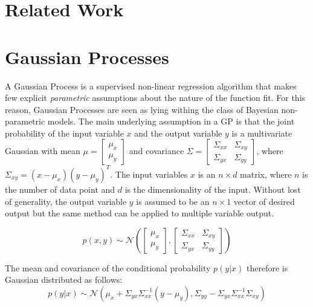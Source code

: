 \documentclass[a4paper,12pt]{article}
\begin{document}
\section{Related Work}
\label{sec-related-work}

\section{Gaussian Processes}
\label{sec-gaussian-process}

A Gaussian Process is a supervised non-linear regression algorithm that makes few explicit \emph{parametric} assumptions about the nature of the function fit. For this reason, Gaussian Processes are seen as lying withing the class of Bayesian non-parametric models. The main underlying assumption in a GP is that the joint probability of the input variable $x$ and the output variable $y$ is a multivariate Gaussian with mean $\mu=\begin{bmatrix} \mu_{x}\\ \mu_{y}\end{bmatrix}$ and covariance $\Sigma=\begin{bmatrix}\Sigma_{xx} & \Sigma_{xy}\\\Sigma_{yx} & \Sigma_{yy} \end{bmatrix}$, where $\Sigma_{xy}=(x-\mu_{x})(y-\mu_{y})^{T}$. The input variables $x$ is an $n\times d$ matrix, where $n$ is the number of data point and $d$ is the dimensionality of the input. Without lost of generality, the output variable $y$ is assumed to be an $n\times1$ vector of desired output but the same method can be applied to multiple variable output.

\begin{equation}
p\left ( x,y\right) \sim \mathcal{N} \left ( \begin{bmatrix}\mu_{x}\\\mu_{y} \end{bmatrix}, \begin{bmatrix}\Sigma_{xx} & \Sigma_{xy}\\\Sigma_{yx} & \Sigma_{yy} \end{bmatrix}\right )
\end{equation}

The mean and covariance of the conditional probability $p(y|x)$ therefore is Gaussian distributed as follows:
\begin{equation}
p(y|x) \sim  \mathcal{N} \left ( \mu_{x}+\Sigma_{yx}\Sigma_{xx}^{-1}\left ( y-\mu_{y}\right ), \Sigma_{yy}-\Sigma_{yx}\Sigma_{xx}^{-1}\Sigma_{xy}\right )
\end{equation}
\end{document}

